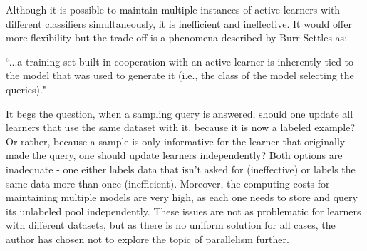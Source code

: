 \documentclass[a4paper,12pt]{article}
\begin{document}
Although it is possible to maintain multiple instances of active learners with different classifiers simultaneously, it is inefficient and ineffective. It would offer more flexibility but the trade-off is a phenomena described by Burr Settles as:

``...a training set built in cooperation with an active learner is inherently tied to the model that was used to generate it (i.e., the class of the model selecting the queries)."\cite{Settles2009}

It begs the question, when a sampling query is answered, should one update all learners that use the same dataset with it, because it is now a labeled example? Or rather, because a sample is only informative for the learner that originally made the query, one should update learners independently? Both options are inadequate - one either labels data that isn't asked for (ineffective) or labels the same data more than once (inefficient). Moreover, the computing costs for maintaining multiple models are very high, as each one needs to store and query its unlabeled pool independently. These issues are not as problematic for learners with different datasets, but as there is no uniform solution for all cases, the author has chosen not to explore the topic of parallelism further.
\end{document}
